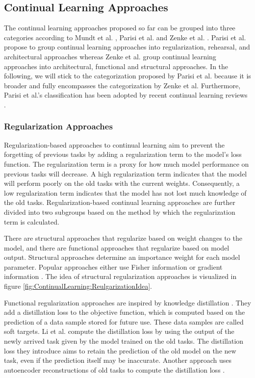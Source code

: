 \subsection{Continual Learning Approaches}
\label{sec:ContinualLearningApproaches}
The continual learning approaches proposed so far can be grouped into three categories according to Mundt et al. \cite{mundt2020wholistic}, Parisi et al. \cite{parisi2019continual}
and Zenke et al. \cite{zenke2017continual}. Parisi et al. propose to group continual learning approaches into regularization, rehearsal,
and architectural approaches whereas Zenke et al.
\cite{zenke2017continual} group continual learning approaches into architectural, functional and structural approaches. In the following, we will stick to the
categorization proposed by Parisi et al. because it is broader and fully encompasses the categorization by Zenke et al. Furthermore, Parisi et al.'s classification has been adopted by
recent continual learning reviews \cite{mundt2020wholistic}.

\subsubsection{Regularization Approaches}
\label{sec:RegularizationApproaches}
Regularization-based approaches to continual learning aim to prevent the forgetting of previous tasks by adding a regularization term to
the model's loss function. The regularization term is a proxy for how much model performance on previous tasks will decrease. A high
regularization term indicates that the model will perform poorly on the old tasks with the current weights. Consequently, a low regularization
term indicates that the model has not lost much knowledge of the old tasks. Regularization-based continual learning approaches are further
divided into two subgroups based on the method by which the regularization term is calculated. \par
There are structural approaches that regularize based on weight changes to the model, and there are functional
approaches that regularize based on model output. Structural approaches determine an importance weight for each
model parameter. Popular approaches either use Fisher information \parencite{kirkpatrick2017overcoming,lee2017overcoming} or
gradient information \parencite{aljundi2018memory,zenke2017continual}. The idea of structural regularization approaches is visualized in
figure \ref{fig:ContinualLearning:ReulgarizationIdea}. \par
Functional regularization approaches are inspired by knowledge distillation \cite{hinton2015distilling}. They add a distillation
loss to the objective function, which is computed based on the prediction of a data sample stored for future use. These data samples
are called soft targets. Li et al. \cite{li2017learning} compute the distillation loss by using the output of the newly arrived task
given by the model trained on the old tasks. The distillation loss they introduce aims to retain the prediction of the old model on
the new task, even if the prediction itself may be inaccurate. Another approach uses autoencoder reconstructions of old tasks to
compute the distillation loss \cite{rannen2017encoder}.

